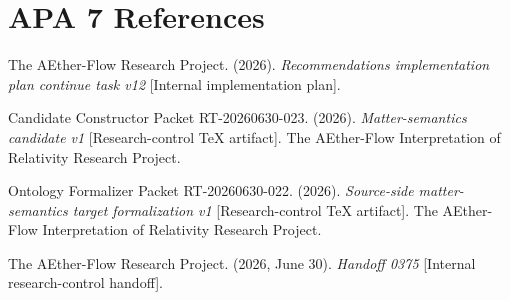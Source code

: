 \documentclass[11pt]{article}
\begin{document}
\section{APA 7 References}

The AEther-Flow Research Project. (2026). \emph{Recommendations implementation
plan continue task v12} [Internal implementation plan].

Candidate Constructor Packet RT-20260630-023. (2026). \emph{Matter-semantics
candidate v1} [Research-control TeX artifact]. The AEther-Flow Interpretation
of Relativity Research Project.

Ontology Formalizer Packet RT-20260630-022. (2026). \emph{Source-side
matter-semantics target formalization v1} [Research-control TeX artifact]. The
AEther-Flow Interpretation of Relativity Research Project.

The AEther-Flow Research Project. (2026, June 30). \emph{Handoff 0375}
[Internal research-control handoff].
\end{document}
